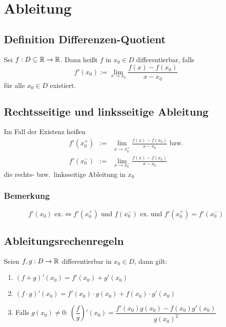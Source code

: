 \section{Ableitung}

\subsection{Definition Differenzen-Quotient}
Sei $f: D \subseteq \mathbb{R} \rightarrow \mathbb{R} $. Dann heißt $f$ in
$x_0 \in D$ differentierbar, falls
\begin{equation*}
    f'(x_0) := \lim_{x \rightarrow x_0}
        \frac{f(x) - f(x_0)}{x - x_0}
\end{equation*}
für alle $x_0 \in D$ existiert.

\subsection{Rechtsseitige und linksseitige Ableitung}
Im Fall der Existenz heißen
\begin{eqnarray*}
    f'(x_0^+) &:=& \lim_{x \rightarrow x_0^+}
        \frac{f(x) - f(x_0)}{x-x_0} \text{ bzw.}\\
    f'(x_0^-) &:=& \lim_{x \rightarrow x_0^-}
        \frac{f(x) - f(x_0)}{x-x_0}
\end{eqnarray*}
die rechts- bzw.\ linksseitige Ableitung in $x_0$

\subsubsection{Bemerkung}
\begin{equation*}
    f'(x_0) \text{ ex.} \Leftrightarrow
    f'(x_0^+) \text{ und } f(x_0^-) \text{ ex.\ und }
    f'(x_0^+) = f'(x_0^-)
\end{equation*}

\subsection{Ableitungsrechenregeln}
Seien $f, g: D \rightarrow \mathbb{R}$ differentierbar in $x_0 \in D$, dann gilt:
\begin{enumerate}[label= (\alph*)]
    \item $(f+g)'(x_0) = f'(x_0) + g'(x_0)$
    \item $(f \cdot g)'(x_0) = f'(x_0) \cdot g(x_0) +
                                f(x_0) \cdot g'(x_0)$
    \item Falls $g(x_0) \neq 0$: $\left( \dfrac{f}{g} \right) '(x_0) =
            \dfrac{f'(x_0) g(x_0) - f(x_0) g'(x_0)}{{g(x_0)}^2}$
\end{enumerate}

